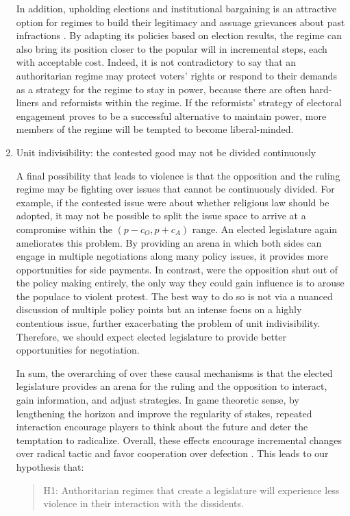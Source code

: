 \begin{enumerate}
In addition, upholding elections and institutional bargaining is an attractive option for regimes to build their legitimacy and assuage grievances about past infractions \citep[339]{Lindberg2009}. By adapting its policies based on election results, the regime can also bring its position closer to the popular will in incremental steps, each with acceptable cost. Indeed, it is not contradictory to say that an authoritarian regime may protect voters’ rights or respond to their demands as a strategy for the regime to stay in power, because there are often hard-liners and reformists within the regime. If the reformists’ strategy of electoral engagement proves to be a successful alternative to maintain power, more members of the regime will be tempted to become liberal-minded.

\item Unit indivisibility: the contested good may not be divided continuously

A final possibility that leads to violence is that the opposition and the ruling regime may be fighting over issues that cannot be continuously divided. For example, if the contested issue were about whether religious law should be adopted, it may not be possible to split the issue space to arrive at a compromise within the $(p - c_O, p + c_A)$ range. An elected legislature again ameliorates this problem. By providing an arena in which both sides can engage in multiple negotiations along many policy issues, it provides more opportunities for side payments. In contrast, were the opposition shut out of the policy making entirely, the only way they could gain influence is to arouse the populace to violent protest. The best way to do so is not via a nuanced discussion of multiple policy points but an intense focus on a highly contentious issue, further exacerbating the problem of unit indivisibility. Therefore, we should expect elected legislature to provide better opportunities for negotiation.

In sum, the overarching of over these causal mechanisms is that the elected legislature provides an arena for the ruling and the opposition to interact, gain information, and adjust strategies. In game theoretic sense, by lengthening the horizon and improve the regularity of stakes, repeated interaction encourage players to think about the future and deter the temptation to radicalize. Overall, these effects encourage incremental changes over radical tactic and favor cooperation over defection \citep{Axelrod1984}. This leads to our hypothesis that:

\begin{quote}
H1: Authoritarian regimes that create a legislature will experience less violence in their interaction with the dissidents.
\end{quote}
\end{enumerate}


